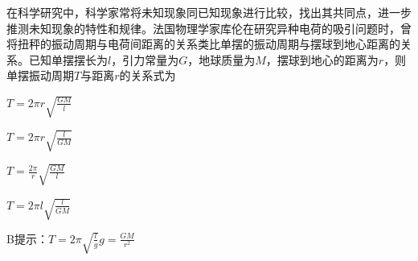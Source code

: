 在科学研究中，科学家常将未知现象同已知现象进行比较，找出其共同点，进一步推测未知现象的特性和规律。法国物理学家库伦在研究异种电荷的吸引问题时，曾将扭秤的振动周期与电荷间距离的关系类比单摆的振动周期与摆球到地心距离的关系。已知单摆摆长为\(l\)，引力常量为\(G\)，地球质量为\(M\)，摆球到地心的距离为\(r\)，则单摆振动周期\(T\)与距离\(r\)的关系式为\paren[]
\begin{choices}
	\item \(T = 2\pi r \sqrt{\frac{GM}{l}}\)\
	\item \(T = 2\pi r \sqrt{\frac{l}{GM}}\)
	\item \(T = \frac{2\pi}{r}\sqrt{\frac{GM}{l}}\)
	\item \(T = 2\pi l \sqrt{\frac{l}{GM}}\)
\end{choices}
\begin{answer}
	B\qquad 提示：\(T = 2\pi \sqrt{\frac{l}{g}}\)\quad \(g = \frac{GM}{r^2}\)
\end{answer}